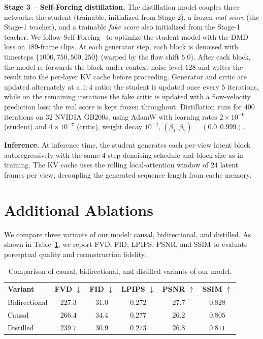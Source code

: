 \noindent\textbf{Stage 3 -- Self-Forcing distillation.}
The distillation model couples three networks: the student (trainable, initialized from Stage 2), a frozen \emph{real score} (the Stage-1 teacher), and a trainable \emph{fake score} also initialized from the Stage-1 teacher. We follow Self-Forcing~\cite{huang2025self} to optimize the student model with the DMD~\cite{yin2024one} loss on $189$-frame clips. At each generator step, each block is denoised with timesteps $\{1000, 750, 500, 250\}$ (warped by the flow shift $5.0$). After each block, the model re-forwards the block under context-noise level $128$ and writes the result into the per-layer KV cache before proceeding. Generator and critic are updated alternately at a $1{:}4$ ratio: the student is updated once every $5$ iterations, while on the remaining iterations the fake critic is updated with a flow-velocity prediction loss; the real score is kept frozen throughout. Distillation runs for $400$ iterations on $32$ NVIDIA GB200s, using AdamW with learning rates $2{\times}10^{-6}$ (student) and $4{\times}10^{-7}$ (critic), weight decay $10^{-2}$, $(\beta_1, \beta_2) = (0.0, 0.999)$.

\noindent\textbf{Inference.}
At inference time, the student generates each per-view latent block autoregressively with the same $4$-step denoising schedule and block size as in training. The KV cache uses the rolling local-attention window of $24$ latent frames per view, decoupling the generated sequence length from cache memory.


\section{Additional Ablations}
\label{app:additional-ablations}

We compare three variants of our model: causal, bidirectional, and distilled.
As shown in Table~\ref{tab:model-variant-ablation}, we report FVD, FID, LPIPS, PSNR, and SSIM to evaluate perceptual quality and reconstruction fidelity.

\begin{table}[t]
  \centering
  \footnotesize
  \caption{Comparison of causal, bidirectional, and distilled variants of our model.}
  \label{tab:model-variant-ablation}
  \vspace{4pt}
  \setlength{\tabcolsep}{4pt}
  \renewcommand{\arraystretch}{1.12}
  \begin{tabular}{@{}lccccc@{}}
    \toprule
    \textbf{Variant}
      & FVD $\downarrow$
      & FID $\downarrow$
      & LPIPS $\downarrow$
      & PSNR $\uparrow$
      & SSIM $\uparrow$ \\
    \midrule
    Bidirectional
      & $227.3$ & $31.0$ & $0.272$ & $27.7$ & $0.828$ \\
    Causal
      & $266.4$ & $34.4$ & $0.277$ & $26.2$ & $0.805$ \\
    Distilled
      & $239.7$ & $30.9$ & $0.273$ & $26.8$ & $0.811$ \\
    \bottomrule
  \end{tabular}
\end{table}


